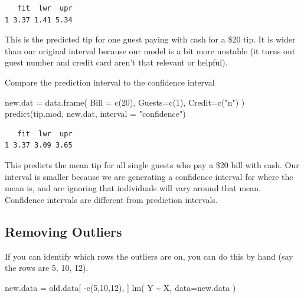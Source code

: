 \documentclass[
  letterpaper,
  DIV=11,
  numbers=noendperiod]{scrreprt}
\newenvironment{Shaded}{\begin{snugshade}}{\end{snugshade}}
\newcommand{\AttributeTok}[1]{\textcolor[rgb]{0.49,0.56,0.16}{#1}}
\newcommand{\DecValTok}[1]{\textcolor[rgb]{0.25,0.63,0.44}{#1}}
\newcommand{\FunctionTok}[1]{\textcolor[rgb]{0.02,0.16,0.49}{#1}}
\newcommand{\NormalTok}[1]{\textcolor[rgb]{0.00,0.44,0.13}{#1}}
\newcommand{\OtherTok}[1]{\textcolor[rgb]{0.00,0.44,0.13}{#1}}
\newcommand{\SpecialCharTok}[1]{\textcolor[rgb]{0.25,0.44,0.63}{#1}}
\newcommand{\StringTok}[1]{\textcolor[rgb]{0.25,0.44,0.63}{#1}}
\begin{document}
\begin{verbatim}
   fit  lwr  upr
1 3.37 1.41 5.34
\end{verbatim}

This is the predicted tip for one guest paying with cash for a \$20 tip.
It is wider than our original interval because our model is a bit more
unstable (it turns out guest number and credit card aren't that relevant
or helpful).

Compare the prediction interval to the confidence interval

\begin{Shaded}
\begin{Highlighting}[]
\NormalTok{new.dat }\OtherTok{=} \FunctionTok{data.frame}\NormalTok{( }\AttributeTok{Bill =} \FunctionTok{c}\NormalTok{(}\DecValTok{20}\NormalTok{), }\AttributeTok{Guests=}\FunctionTok{c}\NormalTok{(}\DecValTok{1}\NormalTok{), }\AttributeTok{Credit=}\FunctionTok{c}\NormalTok{(}\StringTok{"n"}\NormalTok{) )}
\FunctionTok{predict}\NormalTok{(tip.mod, new.dat, }\AttributeTok{interval =} \StringTok{"confidence"}\NormalTok{)}
\end{Highlighting}
\end{Shaded}

\begin{verbatim}
   fit  lwr  upr
1 3.37 3.09 3.65
\end{verbatim}

This predicts the mean tip for all single guests who pay a \$20 bill
with cash. Our interval is smaller because we are generating a
confidence interval for where the mean is, and are ignoring that
individuals will vary around that mean. Confidence intervals are
different from prediction intervals.

\hypertarget{removing-outliers}{%
\subsection{Removing Outliers}\label{removing-outliers}}

If you can identify which rows the outliers are on, you can do this by
hand (say the rows are 5, 10, 12).

\begin{Shaded}
\begin{Highlighting}[]
\NormalTok{new.data }\OtherTok{=}\NormalTok{ old.data[ }\SpecialCharTok{{-}}\FunctionTok{c}\NormalTok{(}\DecValTok{5}\NormalTok{,}\DecValTok{10}\NormalTok{,}\DecValTok{12}\NormalTok{), ]}
\FunctionTok{lm}\NormalTok{( Y }\SpecialCharTok{\textasciitilde{}}\NormalTok{ X, }\AttributeTok{data=}\NormalTok{new.data )}
\end{Highlighting}
\end{Shaded}
\end{document}
